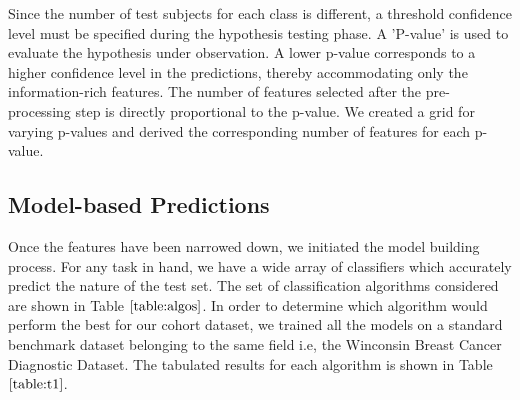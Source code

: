 \documentclass[final,1p,times,twocolumn]{elsarticle}
\begin{document}
Since the number of test subjects for each class is different, a threshold confidence level must be specified during the hypothesis testing phase. A 'P-value' is used to evaluate the hypothesis under observation. A lower p-value corresponds to a higher confidence level in the predictions, thereby accommodating only the information-rich features. The number of features selected after the pre-processing step is directly proportional to the p-value. We created a grid for varying p-values and derived the corresponding number of features for each p-value.   

\subsection{Model-based Predictions}

Once the features have been narrowed down, we initiated the model building process. For any task in hand, we have a wide array of classifiers which accurately predict the nature of the test set. The set of classification algorithms considered are shown in Table $\ref{table:algos}$. In order to determine which algorithm would perform the best for our cohort dataset, we trained all the models on a standard benchmark dataset belonging to the same field i.e, the Winconsin Breast Cancer Diagnostic Dataset. The tabulated results for each algorithm is shown in Table $\ref{table:t1}$.
\end{document}
